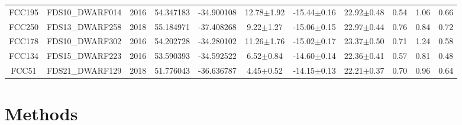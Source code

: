 \documentclass{aa}
\begin{document}
\begin{table}
\begin{center}
{{\begin{tabular}{|ccccccccccc|}
FCC195 & FDS10\_DWARF014 & 2016 & 54.347183 & -34.900108 & 12.78$\pm$1.92 & -15.44$\pm$0.16 & 22.92$\pm$0.48 & 0.54 & 1.06 & 0.66\\
FCC250 & FDS13\_DWARF258 & 2018 & 55.184971 & -37.408268 & 9.22$\pm$1.27 & -15.06$\pm$0.15 & 22.97$\pm$0.44 & 0.76 & 0.84 & 0.72\\
FCC178 & FDS10\_DWARF302 & 2016 & 54.202728 & -34.280102 & 11.26$\pm$1.76 & -15.02$\pm$0.17 & 23.37$\pm$0.50 & 0.71 & 1.24 & 0.58\\
FCC134 & FDS15\_DWARF223 & 2016 & 53.590393 & -34.592522 & 6.52$\pm$0.84 & -14.60$\pm$0.14 & 22.36$\pm$0.41 & 0.57 & 0.81 & 0.48\\
FCC51 & FDS21\_DWARF129 & 2018 & 51.776043 & -36.636787 & 4.45$\pm$0.52 & -14.15$\pm$0.13 & 22.21$\pm$0.37 & 0.70 & 0.96 & 0.64\\ 
\hline
\end{tabular}
}}
\end{center}
\end{table}


\section{Methods}
\end{document}
